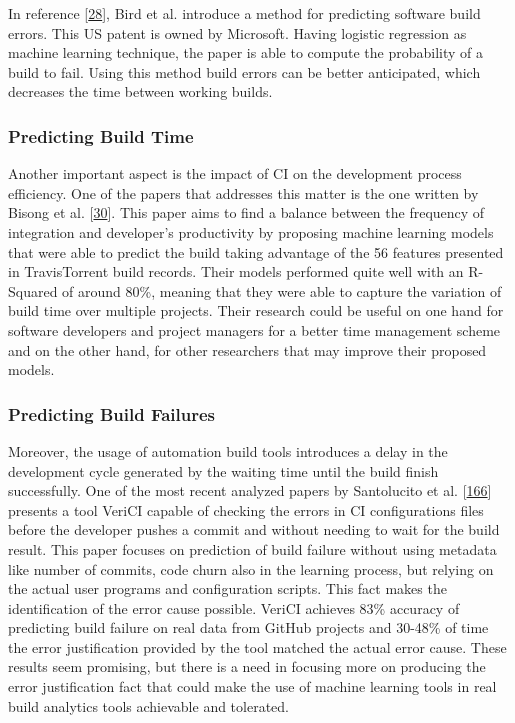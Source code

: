\documentclass[]{book}
\begin{document}
In reference {[}\protect\hyperlink{ref-bird2017predicting}{28}{]}, Bird
et al. introduce a method for predicting software build errors. This US
patent is owned by Microsoft. Having logistic regression as machine
learning technique, the paper is able to compute the probability of a
build to fail. Using this method build errors can be better anticipated,
which decreases the time between working builds.

\subsubsection{Predicting Build Time}\label{predicting-build-time}

Another important aspect is the impact of CI on the development process
efficiency. One of the papers that addresses this matter is the one
written by Bisong et al.
{[}\protect\hyperlink{ref-bisong2017built}{30}{]}. This paper aims to
find a balance between the frequency of integration and developer's
productivity by proposing machine learning models that were able to
predict the build taking advantage of the 56 features presented in
TravisTorrent build records. Their models performed quite well with an
R-Squared of around 80\%, meaning that they were able to capture the
variation of build time over multiple projects. Their research could be
useful on one hand for software developers and project managers for a
better time management scheme and on the other hand, for other
researchers that may improve their proposed models.

\subsubsection{Predicting Build
Failures}\label{predicting-build-failures}

Moreover, the usage of automation build tools introduces a delay in the
development cycle generated by the waiting time until the build finish
successfully. One of the most recent analyzed papers by Santolucito et
al. {[}\protect\hyperlink{ref-santolucito2018statically}{166}{]}
presents a tool VeriCI capable of checking the errors in CI
configurations files before the developer pushes a commit and without
needing to wait for the build result. This paper focuses on prediction
of build failure without using metadata like number of commits, code
churn also in the learning process, but relying on the actual user
programs and configuration scripts. This fact makes the identification
of the error cause possible. VeriCI achieves 83\% accuracy of predicting
build failure on real data from GitHub projects and 30-48\% of time the
error justification provided by the tool matched the actual error cause.
These results seem promising, but there is a need in focusing more on
producing the error justification fact that could make the use of
machine learning tools in real build analytics tools achievable and
tolerated.
\end{document}
